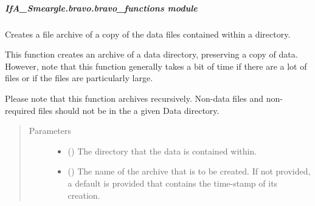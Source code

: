 \documentclass[letterpaper,10pt,english]{sphinxmanual}
\begin{document}
\subparagraph{IfA\_Smeargle.bravo.bravo\_functions module}
\label{\detokenize{python_docstrings/IfA_Smeargle.bravo.bravo_functions:module-IfA_Smeargle.bravo.bravo_functions}}\label{\detokenize{python_docstrings/IfA_Smeargle.bravo.bravo_functions:ifa-smeargle-bravo-bravo-functions-module}}\label{\detokenize{python_docstrings/IfA_Smeargle.bravo.bravo_functions::doc}}

\begin{fulllineitems}
\label{\detokenize{python_docstrings/IfA_Smeargle.bravo.bravo_functions:IfA_Smeargle.bravo.bravo_functions.bravo_archive_data_duplicates}}
Creates a file archive of a copy of the data files contained within a
directory.

This function creates an archive of a data directory, preserving a copy
of data. However, note that this function generally takes a bit of time
if there are a lot of files or if the files are particularly large.

Please note that this function archives recursively. Non-data files and
non-required files should not be in the a given Data directory.
\begin{quote}\begin{description}
\item[{Parameters}] \leavevmode\begin{itemize}
\item {} 
 () \textendash{} The directory that the data is contained within.

\item {} 
 (\sphinxstyleliteralemphasis{\sphinxupquote{ (}}\sphinxstyleliteralemphasis{\sphinxupquote{)}}) \textendash{} The name of the archive that is to be created. If not provided, a
default is provided that contains the time-stamp of its creation.


\end{itemize}
\end{description}
\end{quote}
\end{fulllineitems}
\end{document}

